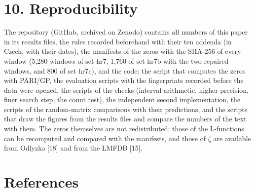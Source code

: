 \documentclass[
  10pt,
]{article}
\begin{document}
\hypertarget{reproducibility}{%
\section{10. Reproducibility}\label{reproducibility}}

The repository (GitHub, archived on Zenodo) contains all numbers of this
paper in its results files, the rules recorded beforehand with their ten
addenda (in Czech, with their dates), the manifests of the zeros with
the SHA-256 of every window (5,280 windows of set hr7, 1,760 of set hr7b
with the two repaired windows, and 800 of set hr7c), and the code: the
script that computes the zeros with PARI/GP, the evaluation scripts with
the fingerprints recorded before the data were opened, the scripts of
the checks (interval arithmetic, higher precision, finer search step,
the count test), the independent second implementation, the scripts of
the random-matrix comparisons with their predictions, and the scripts
that draw the figures from the results files and compare the numbers of
the text with them. The zeros themselves are not redistributed: those of
the L-functions can be recomputed and compared with the manifests, and
those of \(\zeta\) are available from Odlyzko {[}18{]} and from the
LMFDB {[}15{]}.

\hypertarget{references}{%
\section{References}\label{references}}
\small
\end{document}
